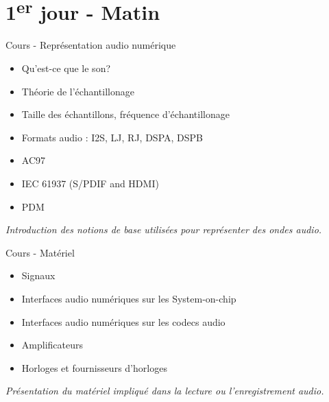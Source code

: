 \documentclass[a4paper,12pt,obeyspaces,spaces,hyphens]{article}
\begin{document}
\feshowtitle

\feshowinfo

\section{1\textsuperscript{er} jour - Matin}

\feagendatwocolumn
{Cours - Représentation audio numérique}
{
  \begin{itemize}
  \item Qu'est-ce que le son?
  \item Théorie de l'échantillonage
  \item Taille des échantillons, fréquence d'échantillonage
  \item Formats audio : I2S, LJ, RJ, DSPA, DSPB
  \item AC97
  \item IEC 61937 (S/PDIF and HDMI)
  \item PDM
  \end{itemize}
  \vspace{0.5em}
  {\em Introduction des notions de base utilisées pour représenter des ondes audio.}
}
{Cours - Matériel}
{
  \begin{itemize}
  \item Signaux
  \item Interfaces audio numériques sur les System-on-chip
  \item Interfaces audio numériques sur les codecs audio
  \item Amplificateurs
  \item Horloges et fournisseurs d'horloges
  \end{itemize}
  \vspace{0.5em}
  {\em Présentation du matériel impliqué dans la lecture ou l'enregistrement audio.}
}
\end{document}
